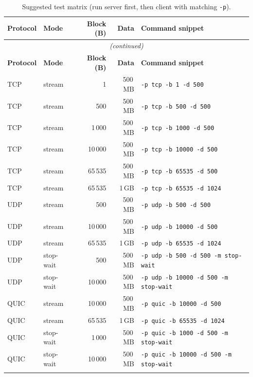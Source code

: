 \documentclass[12pt,a4paper]{article}
\begin{document}
\begin{longtable}{llrrl}
\toprule
\textbf{Protocol} & \textbf{Mode} & \textbf{Block (B)} & \textbf{Data} & \textbf{Command snippet} \\
\midrule
\endfirsthead
\multicolumn{5}{c}{\textit{(continued)}} \\
\toprule
\textbf{Protocol} & \textbf{Mode} & \textbf{Block (B)} & \textbf{Data} & \textbf{Command snippet} \\
\midrule
\endhead
TCP & stream   &     1 & 500\,MB & \lstinline|-p tcp -b 1 -d 500|       \\
TCP & stream   &   500 & 500\,MB & \lstinline|-p tcp -b 500 -d 500|     \\
TCP & stream   & 1\,000 & 500\,MB & \lstinline|-p tcp -b 1000 -d 500|  \\
TCP & stream   & 10\,000 & 500\,MB & \lstinline|-p tcp -b 10000 -d 500| \\
TCP & stream   & 65\,535 & 500\,MB & \lstinline|-p tcp -b 65535 -d 500| \\
TCP & stream   & 65\,535 & 1\,GB  & \lstinline|-p tcp -b 65535 -d 1024| \\
\midrule
UDP & stream   &   500 & 500\,MB & \lstinline|-p udp -b 500 -d 500|    \\
UDP & stream   & 10\,000 & 500\,MB & \lstinline|-p udp -b 10000 -d 500| \\
UDP & stream   & 65\,535 & 1\,GB  & \lstinline|-p udp -b 65535 -d 1024| \\
UDP & stop-wait&   500 & 500\,MB & \lstinline|-p udp -b 500 -d 500 -m stop-wait| \\
UDP & stop-wait& 10\,000 & 500\,MB & \lstinline|-p udp -b 10000 -d 500 -m stop-wait| \\
\midrule
QUIC& stream   & 10\,000 & 500\,MB & \lstinline|-p quic -b 10000 -d 500| \\
QUIC& stream   & 65\,535 & 1\,GB  & \lstinline|-p quic -b 65535 -d 1024| \\
QUIC& stop-wait& 1\,000 & 500\,MB & \lstinline|-p quic -b 1000 -d 500 -m stop-wait| \\
QUIC& stop-wait& 10\,000 & 500\,MB & \lstinline|-p quic -b 10000 -d 500 -m stop-wait| \\
\bottomrule
\caption{Suggested test matrix (run server first, then client with matching \texttt{-p}).}
\label{tab:matrix}
\end{longtable}
\end{document}
